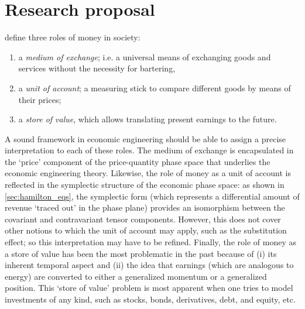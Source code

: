 \chapter{Research proposal}
\label{chap:proposal}
\citet{Mankiw2017} define three roles of money in society:
\begin{enumerate}[itemsep=0.2ex,parsep=0ex,label=(\roman*),topsep=0.2ex]
    \item a \emph{medium of exchange}; i.e. a universal means of exchanging goods and services without the necessity for bartering, 
    \item a \emph{unit of account}; a measuring stick to compare different goods by means of their prices;
    \item a \emph{store of value}, which allows translating present earnings to the future.
\end{enumerate}
A sound framework in economic engineering should be able to assign  a precise interpretation to each of these roles. The medium of exchange is encapsulated in the `price' component of the price-quantity phase space that underlies the economic engineering theory. Likewise, the role of money as a unit of account is reflected in the symplectic structure of the economic phase space: as shown in \cref{sec:hamilton_eqs}, the symplectic form (which represents a differential amount of revenue `traced out' in the phase plane) provides an isomorphism between the covariant and contravariant tensor components. However, this does not cover other notions to which the unit of account may apply, such as the substitution effect; so this interpretation may have to be refined. Finally, the role of money as a store of value has been the most problematic in the past because of (i) its inherent temporal aspect and (ii) the idea that earnings (which are analogous to energy) are converted to either a generalized momentum or a generalized position. This `store of value' problem is most apparent when one tries to model investments of any kind, such as stocks, bonds, derivatives, debt, and equity, etc.

